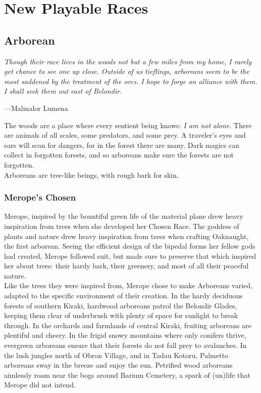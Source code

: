 \chapter{New Playable Races}\label{Races}
\section{Arborean}
 \textit{Though their race lives in the woods not but a few miles from my home, I rarely get chance to see one up close. Outside of us tieflings, arboreans seem to be the most saddened by the treatment of the orcs. I hope to forge an alliance with them. I shall seek them out east of Belondir.}\\
 \begin{flushright}---Malmalor Lumena \end{flushright}
The woods are a place where every sentient being knows: \textit{I am not alone}. There are animals of all scales, some predators, and some prey. A traveler's eyes and ears will scan for dangers, for in the forest there are many. Dark magics can collect in forgotten forests, and so arboreans make sure the forests are not forgotten.\\
Arboreans are tree-like beings, with rough bark for skin.
\subsection{Merope's Chosen}
Merope, inspired by the bountiful green life of the material plane drew heavy inspiration from trees when she developed her Chosen Race. The goddess of plants and nature drew heavy inspiration from trees when crafting Oaknaught, the first arborean. Seeing the efficient design of the bipedal forms her fellow gods had created, Merope followed suit, but made sure to preserve that which inspired her about trees: their hardy bark, their greenery, and most of all their peaceful nature.\\
Like the trees they were inspired from, Merope chose to make Arboreans varied, adapted to the specific environment of their creation. In the hardy deciduous forests of southern Kiraki, hardwood arboreans patrol the Belondir Glades, keeping them clear of underbrush with plenty of space for sunlight to break through. In the orchards and farmlands of central Kiraki, fruiting arboreans are plentiful and cheery. In the frigid snowy mountains where only conifers thrive, evergreen arboreans ensure that their forests do not fall prey to avalanches. In the lush jungles north of Obron Village, and in Tadau Kotoru, Palmetto arboreans sway in the breeze and enjoy the sun. Petrified wood arboreans aimlessly roam near the bogs around Barium Cemetery, a spark of (un)life that Merope did not intend.
